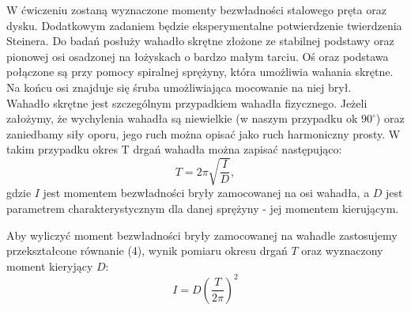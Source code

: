 \documentclass[10pt,a4paper]{article}
\newcommand{\forceindent}{\leavevmode{\parindent=3em\indent}}
\begin{document}
\forceindent W ćwiczeniu zostaną wyznaczone momenty bezwładności stalowego pręta oraz dysku. Dodatkowym
zadaniem będzie eksperymentalne potwierdzenie twierdzenia Steinera. Do badań posłuży wahadło skrętne
złożone ze stabilnej podstawy oraz pionowej osi osadzonej na łożyskach o bardzo małym tarciu. Oś oraz
podstawa połączone są przy pomocy spiralnej sprężyny, która umożliwia wahania skrętne. Na końcu osi
znajduje się śruba umożliwiająca mocowanie na niej brył.\\
\forceindent Wahadło skrętne jest szczególnym przypadkiem wahadła fizycznego. Jeżeli założymy, że wychylenia
wahadła są niewielkie (w naszym przypadku ok $90^{\circ}$) oraz zaniedbamy siły oporu, jego ruch można opisać jako ruch
harmoniczny prosty. W takim przypadku okres T drgań wahadła można zapisać następująco:
\begin{equation}
T = 2 \pi \sqrt{\frac{I}{D}},
\end{equation}
gdzie $I$ jest momentem bezwładności bryły zamocowanej na osi wahadła, a $D$ jest parametrem charakterystycznym dla danej sprężyny - jej momentem kierującym.

\forceindent Aby wyliczyć moment bezwładności bryły zamocowanej na wahadle zastosujemy przekształcone równanie (4), wynik pomiaru okresu drgań $T$ oraz wyznaczony moment kieryjący $D$:
\begin{equation}
I = D \left(\frac{T}{2\pi}\right)^2
\end{equation}
\end{document}
